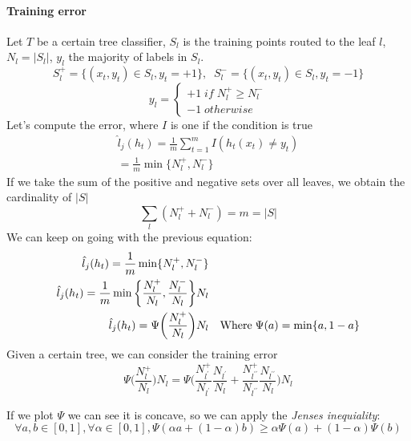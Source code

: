 \paragraph{Training error}
Let $T$ be a certain tree classifier, $S_l$ is the training points routed to the leaf $l$,
$N_l = |S_l|$, $y_l$ the majority of labels in $S_l$.
$$S_l^+ = \{ (x_t, y_t) \in S_l, y_t = +1\},\;\;S_l^- = \{ (x_t, y_t) \in S_l, y_t = -1\}$$
\[
    y_l = \begin{cases}
        +1 \mathit{\;if\;} N_l^+ \geq N_l^-\\
        -1 \mathit{\;otherwise}
    \end{cases}\]
Let's compute the error, where $I$ is one if the condition is true
\begin{equation}
    \begin{aligned}
        \hat{l}_j(h_t) = \frac{1}{m}\sum_{t=1}^m I(h_t(x_t) \neq y_t)\\
        = \frac{1}{m}\min\{N_l^+, N_l^-\}
    \end{aligned}
\end{equation}
If we take the sum of the positive and negative sets over all leaves, we 
obtain the cardinality of $|S|$ 
$$\sum_l(N_l^+ + N_l^-) = m = |S|$$
We can keep on going with the previous equation:
\begin{equation}
    \begin{aligned}
        \hat{l}_j(h_t) = \frac{1}{m}\min\{N_l^+, N_l^-\}\\
        \hat{l}_j(h_t) = \frac{1}{m}\min\bigg\{\frac{N_l^+}{N_l}, \frac{N_l^-}{N_l}\bigg\}N_l\\
        \hat{l}_j(h_t) = \Psi\bigg(\frac{N_l^+}{N_l}\bigg)N_l && \text{Where\;} \Psi(a) = \min\{a, 1-a\}
    \end{aligned}
\end{equation}
Given a certain tree, 
we can consider the training error 
\begin{equation}
    \Psi\bigg(\frac{N_l^+}{N_l}\bigg)N_l = 
    \Psi\bigg(\frac{N_{l^\prime}^+}{N_{l^\prime}}
    \frac{N_{l^\prime}}{N_l}+\frac{N_{l^{\prime\prime}}^+}{N_{l^{\prime\prime}}}
    \frac{N_{l^{\prime\prime}}}{N_l}
    \bigg)N_l
\end{equation}

If we plot $\Psi$ we can see it is concave, so we can apply the \emph{Jenses inequiality}:
$$\forall a,b \in [0,1], \forall \alpha \in [0,1], 
\Psi(\alpha a + (1-\alpha)b) \geq \alpha \Psi(a) + (1-\alpha)\Psi(b)$$

